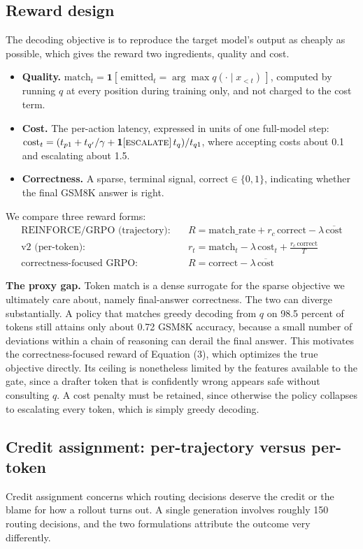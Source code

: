 \documentclass[11pt]{article}
\begin{document}
\subsection{Reward design}
The decoding objective is to reproduce the target model's output as cheaply as possible, which gives
the reward two ingredients, quality and cost.
\begin{itemize}\itemsep1pt
\item \textbf{Quality.} $\text{match}_t=\mathbf{1}[\,\text{emitted}_t=\arg\max q(\cdot\mid x_{<t})\,]$,
computed by running $q$ at every position during training only, and not charged to the cost term.
\item \textbf{Cost.} The per-action latency, expressed in units of one full-model step:
$\text{cost}_t=(t_{p1}+t_{q'}/\gamma+\mathbf{1}[\textsc{escalate}]\,t_q)/t_{q1}$, where accepting costs
about 0.1 and escalating about 1.5.
\item \textbf{Correctness.} A sparse, terminal signal, $\text{correct}\in\{0,1\}$, indicating whether
the final GSM8K answer is right.
\end{itemize}
We compare three reward forms:
\begin{align}
\text{REINFORCE/GRPO (trajectory):}\quad & R=\text{match\_rate}+r_c\,\text{correct}-\lambda\,\overline{\text{cost}} \\
\text{v2 (per-token):}\quad & r_t=\text{match}_t-\lambda\,\text{cost}_t+\tfrac{r_c\,\text{correct}}{T} \\
\text{correctness-focused GRPO:}\quad & R=\text{correct}-\lambda\,\overline{\text{cost}}
\end{align}

\textbf{The proxy gap.} Token match is a dense surrogate for the sparse objective we ultimately care
about, namely final-answer correctness. The two can diverge substantially. A policy that matches greedy
decoding from $q$ on 98.5 percent of tokens still attains only about 0.72 GSM8K accuracy, because a
small number of deviations within a chain of reasoning can derail the final answer. This motivates the
correctness-focused reward of Equation (3), which optimizes the true objective directly. Its ceiling is
nonetheless limited by the features available to the gate, since a drafter token that is confidently
wrong appears safe without consulting $q$. A cost penalty must be retained, since otherwise the policy
collapses to escalating every token, which is simply greedy decoding.

\subsection{Credit assignment: per-trajectory versus per-token}
Credit assignment concerns which routing decisions deserve the credit or the blame for how a rollout
turns out. A single generation involves roughly 150 routing decisions, and the two formulations
attribute the outcome very differently.
\end{document}
